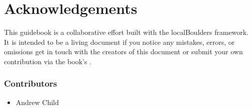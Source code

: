 \chapter{Acknowledgements}
\lhead{\textcolor{\chapterColor}{\rule[-2pt]{\textwidth}{15pt}}}
This guidebook is a collaborative effort built with the localBoulders framework. It is intended to be a living document if you notice any mistakes, errors, or omissions get in touch with the creators of this document or submit your own contribution via the book's .
\subsection*{Contributors}
\begin{itemize}
\item Andrew Child
\end{itemize}
\clearpage